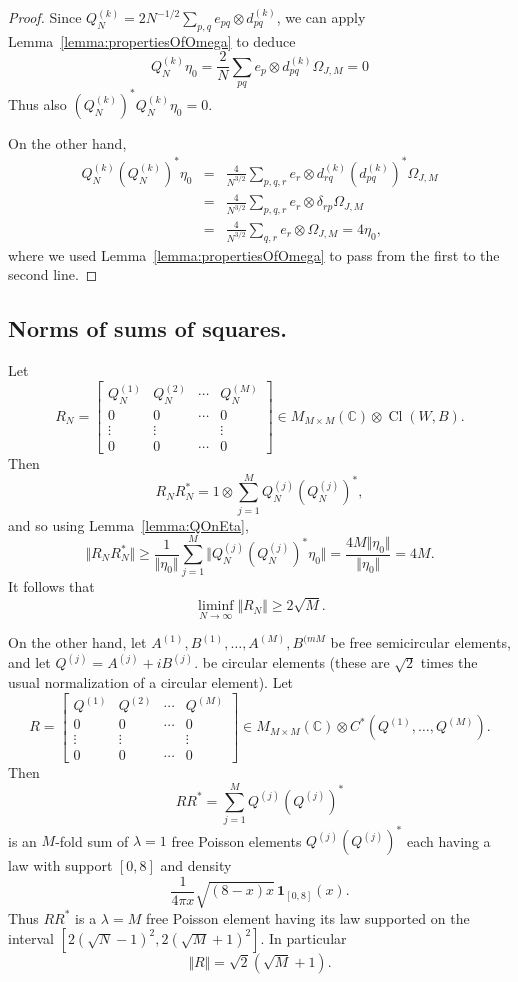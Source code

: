 \documentclass[11pt]{article}
\newcommand{\Cl}{\operatorname{Cl}}
\begin{document}
\begin{proof}
    Since $Q^{(k)}_N = 2 N^{-1/2} \sum_{p,q} e_{pq}\otimes d_{pq}^{(k)}$, we can apply Lemma~\ref{lemma:propertiesOfOmega} to deduce
    \[Q_N^{(k)} \eta_0 = \frac{2}{N}\sum_{pq} e_{p}\otimes  d_{pq}^{(k)} \Omega_{J,M} = 0  \] Thus also \( (Q^{(k)}_N)^* Q^{(k)}_N\eta_0 = 0\).

    On the other hand,
    \begin{eqnarray*}
        Q^{(k)}_N (Q^{(k)}_N)^* \eta_0 &=& 
        \frac{4}{N^{3/2}}\sum_{p,q,r} e_{r} \otimes d_{rq}^{(k)} (d_{pq}^{(k)})^* \Omega_{J,M} \\
        &=& \frac{4}{N^{3/2}}\sum_{p,q,r} e_{r} \otimes \delta_{rp}  \Omega_{J,M}  \\
        &=& \frac{4}{N^{3/2}}\sum_{q,r} e_{r} \otimes \Omega_{J,M}  
        =4\eta_0,
    \end{eqnarray*} where we used Lemma~\ref{lemma:propertiesOfOmega} to pass from the first to the second line.
\end{proof}

\subsection{Norms of sums of squares.}
Let $$R_N = \begin{bmatrix} Q_N^{(1)} & Q_N^{(2)} & \cdots & Q_N^{(M)} \\
0 & 0 & \cdots & 0 \\
\vdots & \vdots  & & \vdots \\
0 & 0 & \cdots & 0 \end{bmatrix} \in M_{M\times M}(\mathbb{C})\otimes \Cl(W,B). $$  Then $$
R_N R_N^*  = 1\otimes \sum_{j=1}^M Q_N^{(j)} (Q_N^{(j)})^*,$$ and so using Lemma~\ref{lemma:QOnEta}, $$\Vert R_N R_N^*\Vert \geq \frac{1}{\Vert \eta_0 \Vert} \sum_{j=1}^M \Vert Q_N^{(j)} (Q_N^{(j)})^* \eta_0 \Vert = \frac{4M\Vert\eta_0\Vert}{\Vert\eta_0\Vert}=4M.
$$
It follows that $$\liminf_{N\to\infty} \Vert R_N \Vert \geq 2\sqrt{M}. $$

On the other hand, let $A^{(1)},B^{(1)},\dots,A^{(M)},B^{(mM}$ be free semicircular elements, and let $Q^{(j)}=A^{(j)} + i B^{(j)}$.  be  circular elements (these are $\sqrt{2}$ times the usual normalization of a circular element).  Let $$
R = \begin{bmatrix} Q^{(1)} & Q^{(2)} & \cdots & Q^{(M)} \\
0 & 0 & \cdots & 0 \\
\vdots & \vdots  & & \vdots \\
0 & 0 & \cdots & 0 \end{bmatrix} \in M_{M\times M}(\mathbb{C})\otimes C^*(Q^{(1)},\dots,Q^{(M)}).
$$
Then $$RR^* = \sum_{j=1}^M Q^{(j)} (Q^{(j)})^*$$ is an $M$-fold sum of $\lambda=1$ free Poisson elements $Q^{(j)}(Q^{(j)})^*$ each having a law with support $[0,8]$ and density $$
\frac{1}{4\pi x}\sqrt{(8-x)x}\,
\mathbf 1_{[0,8]}(x).
$$  
Thus $RR^*$ is a $\lambda=M$  free Poisson element having its law supported on the interval 
$[2(\sqrt{N}-1)^2,2(\sqrt{M}+1)^2]$. %
In particular $$\Vert R\Vert = \sqrt{2}(\sqrt{M}+1).$$
\end{document}

